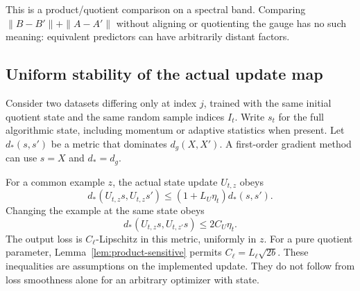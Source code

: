 This is a product/quotient comparison on a spectral band. Comparing
$\|B-B'\|+\|A-A'\|$ without aligning or quotienting the gauge has no
such meaning: equivalent predictors can have arbitrarily distant factors.

\subsection{Uniform stability of the actual update map}
Consider two datasets differing only at index $j$, trained with the same
initial quotient state and the same random sample indices $I_t$. Write
$s_t$ for the full algorithmic state, including momentum or adaptive
statistics when present. Let $d_*(s,s')$ be a metric that dominates
$d_g(X,X')$. A first-order gradient method can use $s=X$ and $d_*=d_g$.

\begin{assumption}
\label{ass:state-stability}
For a common example $z$, the actual state update $U_{t,z}$ obeys
\begin{equation}
 d_*(U_{t,z}s,U_{t,z}s')\leq(1+L_U\eta_t)d_*(s,s').
 \label{eq:update-lipschitz}
\end{equation}
Changing the example at the same state obeys
\begin{equation}
 d_*(U_{t,z}s,U_{t,z'}s)\leq2C_U\eta_t.
 \label{eq:sample-injection}
\end{equation}
The output loss is $C_\ell$-Lipschitz in this metric, uniformly in $z$.
For a pure quotient parameter, Lemma~\ref{lem:product-sensitive} permits
$C_\ell=L_\ell\sqrt{2b}$. These inequalities are assumptions on the
implemented update. They do not follow from loss smoothness alone for an
arbitrary optimizer with state.
\end{assumption}

